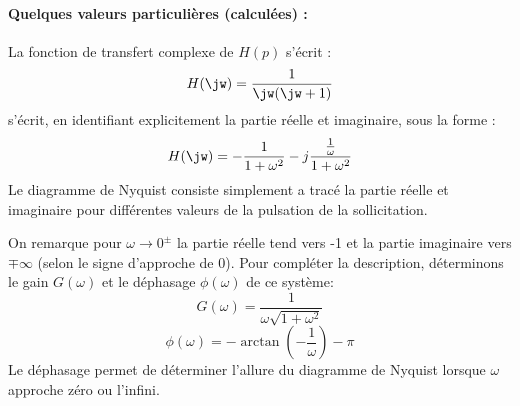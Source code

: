 \paragraph{Quelques valeurs particulières (calculées) :}
\begin{center}
\end{center}
\clearpage
La fonction de transfert complexe de $H(p)$ s'écrit :
\[
    H(\jw)=\dfrac{1}{\jw(\jw+1)}
\]
s'écrit, en identifiant explicitement la partie réelle et imaginaire, sous la 
forme :
\[
    H(\jw)=-\dfrac{1}{1+\omega^2}-j\dfrac{\frac{1}{\omega}}{1+\omega^2}
\]
Le diagramme de Nyquist consiste simplement a tracé la partie réelle et 
imaginaire pour différentes valeurs de la pulsation de la sollicitation.
\begin{figure}[!h]
    \centering
    
\end{figure}
On remarque pour $\omega\rightarrow0^\pm$ la partie réelle tend vers -1 et la 
partie imaginaire vers $\mp\infty$ (selon le signe d'approche de 0).
Pour compléter la description, déterminons le gain $G(\omega)$ et le déphasage 
$\phi(\omega)$ de ce système:
\[
    G(\omega)=\dfrac{1}{\omega\sqrt{1+\omega^2}}
\]
\[
    \phi(\omega)=-\arctan{\left(-\dfrac{1}{\omega}\right)}-\pi
\]
Le déphasage permet de déterminer l'allure du diagramme de Nyquist 
lorsque $\omega$ approche zéro ou l'infini. 
